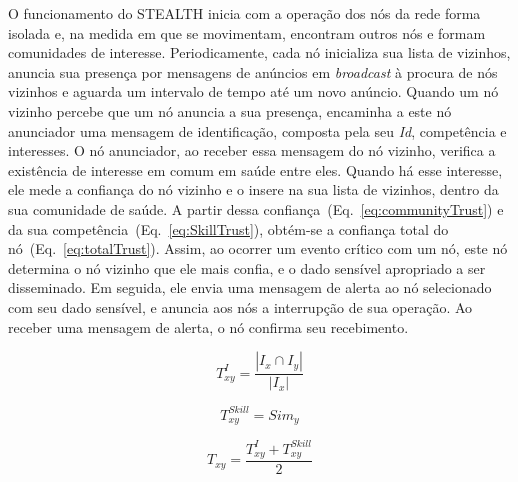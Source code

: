\documentclass[12pt]{article}
\begin{document}
O funcionamento do \mbox{STEALTH} inicia com a operação dos nós da rede
forma isolada e, na medida em que se movimentam, encontram outros nós e
formam comunidades de interesse. Periodicamente, cada nó inicializa sua lista de vizinhos, anuncia sua presença por mensagens de anúncios em \textit{broadcast} à procura de nós vizinhos e aguarda um intervalo de tempo até um novo anúncio.  Quando um nó vizinho percebe que um nó anuncia a sua presença, encaminha a este nó anunciador uma mensagem de identificação, composta pela seu \textit{Id}, competência e interesses. O nó anunciador, ao receber essa mensagem do nó vizinho, verifica a existência de interesse em comum em saúde entre eles. Quando há esse interesse, ele mede a confiança do nó vizinho e o insere na sua lista de vizinhos, dentro da sua comunidade de saúde. A partir dessa confiança~(Eq.~\ref{eq:communityTrust}) e da sua competência~(Eq.~\ref{eq:SkillTrust}), obtém-se a confiança total do nó~(Eq.~\ref{eq:totalTrust}). 
Assim, ao ocorrer um evento crítico com um nó, este nó determina o nó vizinho que ele mais confia, e o dado sensível apropriado a ser disseminado. Em seguida, ele envia uma mensagem de alerta ao nó selecionado com seu dado sensível, e anuncia aos nós a interrupção de sua operação. Ao receber uma mensagem de alerta, o nó confirma seu recebimento.


\vspace{-0.5cm}

\noindent
\begin{minipage}{.3\linewidth}
\centering
\begin{equation}
T_{xy}^{I} = \frac {|I_x \cap I_y|}{|I_x|}
\label{eq:communityTrust}
\end{equation}
\end{minipage}
\begin{minipage}{.3\linewidth}
\centering
\begin{equation}
T_{xy}^{Skill} = Sim_y
\label{eq:SkillTrust}
\end{equation}
\end{minipage}
\hspace{0.5cm}
\begin{minipage}{.3\linewidth}
\centering
\begin{equation}
T_{xy} = \frac{T_{xy}^{I} + T_{xy}^{Skill}}{2}
\label{eq:totalTrust}
\end{equation}
\end{minipage}
\end{document}
